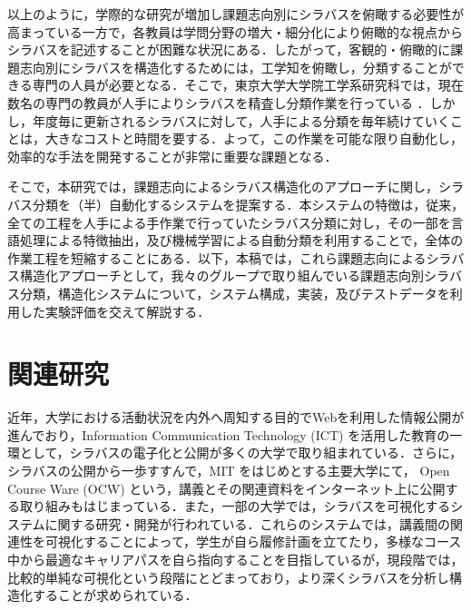 \documentclass[japanese]{jnlp_1.4}
\begin{document}
以上のように，学際的な研究が増加し課題志向別にシラバスを俯瞰する必要性が高まっている一方で，各教員は学問分野の増大・細分化により俯瞰的な視点からシラバスを記述することが困難な状況にある．したがって，客観的・俯瞰的に課題志向別にシラバスを構造化するためには，工学知を俯瞰し，分類することができる専門の人員が必要となる．そこで，東京大学大学院工学系研究科では，現在数名の専門の教員が人手によりシラバスを精査し分類作業を行っている\cite{Web_Kadaisikou} ．しかし，年度毎に更新されるシラバスに対して，人手による分類を毎年続けていくことは，大きなコストと時間を要する．よって，この作業を可能な限り自動化し，効率的な手法を開発することが非常に重要な課題となる．

そこで，本研究では，課題志向によるシラバス構造化のアプローチに関し，シラバス分類を（半）自動化するシステムを提案する．本システムの特徴は，従来，全ての工程を人手による手作業で行っていたシラバス分類に対し，その一部を言語処理による特徴抽出，及び機械学習による自動分類を利用することで，全体の作業工程を短縮することにある．以下，本稿では，これら課題志向によるシラバス構造化アプローチとして，我々のグループで取り組んでいる課題志向別シラバス分類，構造化システムについて，システム構成，実装，及びテストデータを利用した実験評価を交えて解説する．


\section{関連研究}

近年，大学における活動状況を内外へ周知する目的でWebを利用した情報公開が進んでおり，Information Communication Technology (ICT) を活用した教育の一環として，シラバスの電子化と公開が多くの大学で取り組まれている．さらに，シラバスの公開から一歩すすんで，MIT をはじめとする主要大学にて， Open Course Ware (OCW) という，講義とその関連資料をインターネット上に公開する取り組みもはじまっている．また，一部の大学では，シラバスを可視化するシステムに関する研究・開発が行われている\cite{Article_Miyoshi_2006}．これらのシステムでは，講義間の関連性を可視化することによって，学生が自ら履修計画を立てたり，多様なコース中から最適なキャリアパスを自ら指向することを目指しているが，現段階では，比較的単純な可視化という段階にとどまっており，より深くシラバスを分析し構造化することが求められている．
\end{document}
